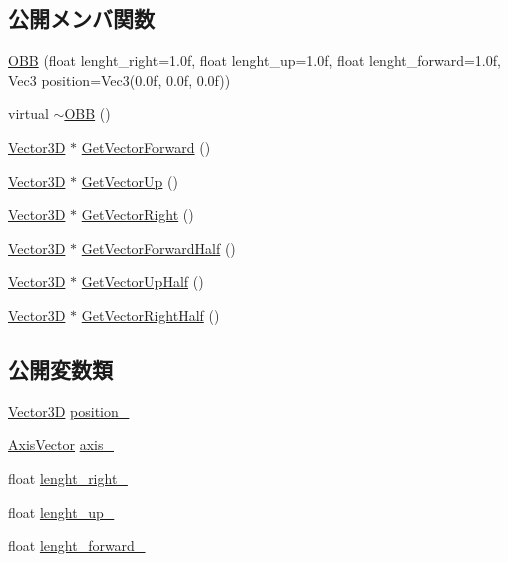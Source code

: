 \subsection*{公開メンバ関数}
\begin{DoxyCompactItemize}
\item 
\mbox{\hyperlink{class_o_b_b_a368e87fc4c7cbc04569229010c88f8cc}{O\+BB}} (float lenght\+\_\+right=1.\+0f, float lenght\+\_\+up=1.\+0f, float lenght\+\_\+forward=1.\+0f, Vec3 position=\+Vec3(0.\+0f, 0.\+0f, 0.\+0f))
\item 
virtual \mbox{\hyperlink{class_o_b_b_aa95ab77e0c88faf68db43ed7f6b0ea5a}{$\sim$\+O\+BB}} ()
\item 
\mbox{\hyperlink{class_vector3_d}{Vector3D}} $\ast$ \mbox{\hyperlink{class_o_b_b_a03fdc91609b94007369d3ba168dbb54d}{Get\+Vector\+Forward}} ()
\item 
\mbox{\hyperlink{class_vector3_d}{Vector3D}} $\ast$ \mbox{\hyperlink{class_o_b_b_a0c0fd050224beb2c196e923e177bc0d5}{Get\+Vector\+Up}} ()
\item 
\mbox{\hyperlink{class_vector3_d}{Vector3D}} $\ast$ \mbox{\hyperlink{class_o_b_b_ace28639ea3a6c38d994d82d0dd40496e}{Get\+Vector\+Right}} ()
\item 
\mbox{\hyperlink{class_vector3_d}{Vector3D}} $\ast$ \mbox{\hyperlink{class_o_b_b_a03218b64dad1985876e7bad09f4a61ce}{Get\+Vector\+Forward\+Half}} ()
\item 
\mbox{\hyperlink{class_vector3_d}{Vector3D}} $\ast$ \mbox{\hyperlink{class_o_b_b_a48255d7b9af2d2ea109de41787c30a3a}{Get\+Vector\+Up\+Half}} ()
\item 
\mbox{\hyperlink{class_vector3_d}{Vector3D}} $\ast$ \mbox{\hyperlink{class_o_b_b_a1c3a21fd4ff8dcc55d4f5d20c563ebd6}{Get\+Vector\+Right\+Half}} ()
\end{DoxyCompactItemize}
\subsection*{公開変数類}
\begin{DoxyCompactItemize}
\item 
\mbox{\hyperlink{class_vector3_d}{Vector3D}} \mbox{\hyperlink{class_o_b_b_ab05a884fc030d7a3cf7b355880d9194c}{position\+\_\+}}
\item 
\mbox{\hyperlink{class_axis_vector}{Axis\+Vector}} \mbox{\hyperlink{class_o_b_b_ab002fad8cf0a9a08fc50407dc849aab1}{axis\+\_\+}}
\item 
float \mbox{\hyperlink{class_o_b_b_a33c3db74caad2f0827d71ab16e9c5f1d}{lenght\+\_\+right\+\_\+}}
\item 
float \mbox{\hyperlink{class_o_b_b_a4c7f9246708424221b38051cc763ca3c}{lenght\+\_\+up\+\_\+}}
\item 
float \mbox{\hyperlink{class_o_b_b_a999f5165cf4cb28b7b59a75e81613bab}{lenght\+\_\+forward\+\_\+}}
\end{DoxyCompactItemize}
